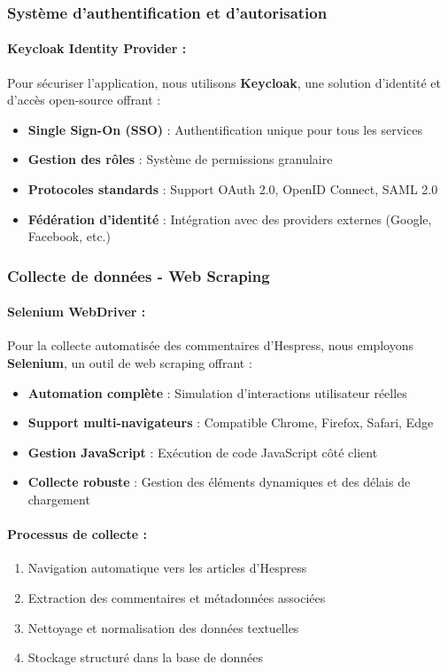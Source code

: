 \subsubsection{Système d'authentification et d'autorisation}

\paragraph{Keycloak Identity Provider :}
Pour sécuriser l'application, nous utilisons \textbf{Keycloak}, une solution d'identité et d'accès open-source offrant :

\begin{itemize}
    \item \textbf{Single Sign-On (SSO)} : Authentification unique pour tous les services
    \item \textbf{Gestion des rôles} : Système de permissions granulaire
    \item \textbf{Protocoles standards} : Support OAuth 2.0, OpenID Connect, SAML 2.0
    \item \textbf{Fédération d'identité} : Intégration avec des providers externes (Google, Facebook, etc.)
\end{itemize}

\subsubsection{Collecte de données - Web Scraping}

\paragraph{Selenium WebDriver :}
Pour la collecte automatisée des commentaires d'Hespress, nous employons \textbf{Selenium}, un outil de web scraping offrant :

\begin{itemize}
    \item \textbf{Automation complète} : Simulation d'interactions utilisateur réelles
    \item \textbf{Support multi-navigateurs} : Compatible Chrome, Firefox, Safari, Edge
    \item \textbf{Gestion JavaScript} : Exécution de code JavaScript côté client
    \item \textbf{Collecte robuste} : Gestion des éléments dynamiques et des délais de chargement
\end{itemize}

\paragraph{Processus de collecte :}
\begin{enumerate}
    \item Navigation automatique vers les articles d'Hespress
    \item Extraction des commentaires et métadonnées associées
    \item Nettoyage et normalisation des données textuelles
    \item Stockage structuré dans la base de données
\end{enumerate}

